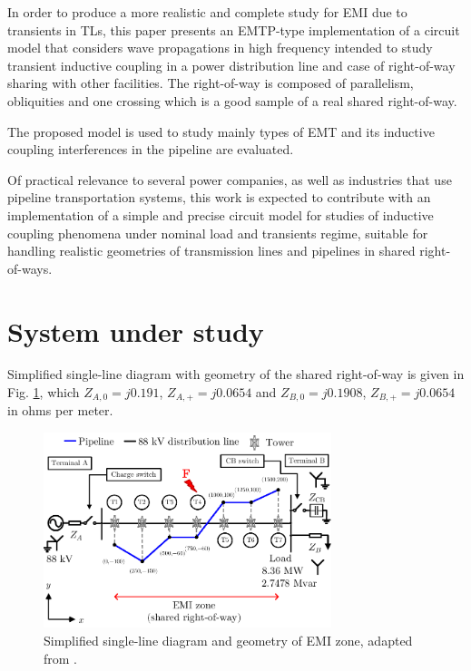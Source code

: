\documentclass[5p,twocolumn]{elsarticle}
\begin{document}
In  order  to  produce  a  more  realistic  and  complete study  for  EMI due to transients in TLs,  this  paper presents an EMTP-type implementation of a circuit model that considers wave propagations in high frequency intended to study transient inductive coupling in a power distribution line and case of right-of-way sharing with other facilities. The right-of-way is composed of parallelism, obliquities and one crossing which is a good sample of a real shared right-of-way. 

The proposed model is used to study mainly types of EMT and its inductive coupling interferences in the pipeline are evaluated.

Of practical relevance to several power companies, as well as industries that use pipeline transportation systems, this work is expected to contribute with an implementation of a simple and precise circuit model for studies of inductive coupling phenomena under nominal load and transients regime, suitable for handling realistic geometries of transmission lines and pipelines in shared right-of-ways.

\section{System under study}

Simplified single-line diagram with geometry of the shared right-of-way is given in Fig. \ref{fig:EMIzone}, which $Z_{A,0} = j0.191$, $Z_{A,+} = j0.0654$ and $Z_{B,0} = j0.1908$, $Z_{B,+} = j0.0654$ in ohms per meter. 

\begin{figure}[h]
	\begin{center}
		\includegraphics[width=8.4cm]{img/sys_88_top.pdf}    %
		\caption{Simplified single-line diagram and geometry of EMI zone, adapted from \cite{Martins-Britto2020}.} 
		\label{fig:EMIzone}
	\end{center}
\end{figure}
\end{document}
